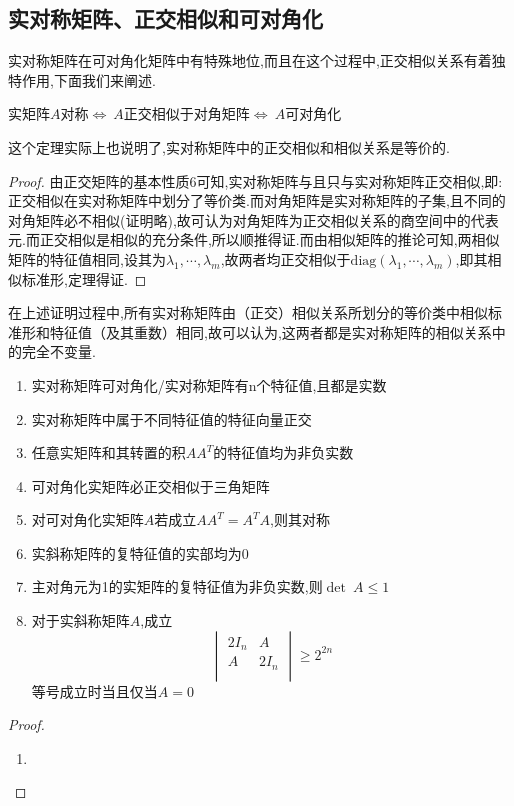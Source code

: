 \documentclass[UTF8,a4paper,notitlepage]{book}
\begin{document}
        \subsection{实对称矩阵、正交相似和可对角化}
        实对称矩阵在可对角化矩阵中有特殊地位,而且在这个过程中,正交相似关系有着独特作用,下面我们来阐述.
        \begin{theorem}\label{Skew-Diag}
            实矩阵$A$对称$\Leftrightarrow~A$正交相似于对角矩阵$\Leftrightarrow~A$可对角化
        \end{theorem}
        这个定理实际上也说明了,实对称矩阵中的正交相似和相似关系是等价的.
        \begin{proof}\mbox{}
            由正交矩阵的基本性质6可知,实对称矩阵与且只与实对称矩阵正交相似,即:正交相似在实对称矩阵中划分了等价类.而对角矩阵是实对称矩阵的子集,且不同的对角矩阵必不相似(证明略),故可认为对角矩阵为正交相似关系的商空间中的代表元.而正交相似是相似的充分条件,所以顺推得证.而由相似矩阵的推论可知,两相似矩阵的特征值相同,设其为$\lambda_1,\cdots,\lambda_m$,故两者均正交相似于$\mathrm{diag}(\lambda_1,\cdots,\lambda_m)$,即其相似标准形,定理得证.
        \end{proof}
        在上述证明过程中,所有实对称矩阵由（正交）相似关系所划分的等价类中相似标准形和特征值（及其重数）相同,故可以认为,这两者都是实对称矩阵的相似关系中的完全不变量.
        \begin{corollary}[可对角化实矩阵]\begin{enumerate}\mbox{}
            \item 实对称矩阵可对角化/实对称矩阵有n个特征值,且都是实数
            \item 实对称矩阵中属于不同特征值的特征向量正交
            \item 任意实矩阵和其转置的积$AA^T$的特征值均为非负实数
            \item 可对角化实矩阵必正交相似于三角矩阵
            \item 对可对角化实矩阵$A$若成立$AA^T=A^TA$,则其对称
            \item 实斜称矩阵的复特征值的实部均为0
            \item 主对角元为1的实矩阵的复特征值为非负实数,则$\det~A\leq 1$
            \item 对于实斜称矩阵$A$,成立$$\begin{vmatrix}
                2I_n&A\\ A&2I_n\\ 
            \end{vmatrix}\geq 2^{2n}$$等号成立时当且仅当$A=0$
        \end{enumerate}\end{corollary}
        \begin{proof}\begin{enumerate}\mbox{}
                \item 
        \end{enumerate}\end{proof}
\end{document}
